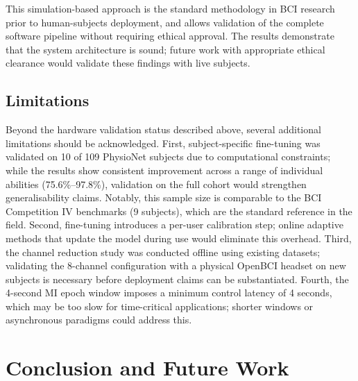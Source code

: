 \documentclass[12pt, a4paper]{article}
\begin{document}
This simulation-based approach is the standard methodology in BCI research prior to human-subjects deployment, and allows validation of the complete software pipeline without requiring ethical approval. The results demonstrate that the system architecture is sound; future work with appropriate ethical clearance would validate these findings with live subjects.

\subsection{Limitations}

Beyond the hardware validation status described above, several additional limitations should be acknowledged. First, subject-specific fine-tuning was validated on 10 of 109 PhysioNet subjects due to computational constraints; while the results show consistent improvement across a range of individual abilities (75.6\%--97.8\%), validation on the full cohort would strengthen generalisability claims. Notably, this sample size is comparable to the BCI Competition IV benchmarks (9 subjects), which are the standard reference in the field. Second, fine-tuning introduces a per-user calibration step; online adaptive methods that update the model during use would eliminate this overhead. Third, the channel reduction study was conducted offline using existing datasets; validating the 8-channel configuration with a physical OpenBCI headset on new subjects is necessary before deployment claims can be substantiated. Fourth, the 4-second MI epoch window imposes a minimum control latency of 4 seconds, which may be too slow for time-critical applications; shorter windows or asynchronous paradigms could address this.

\section{Conclusion and Future Work}
\end{document}
